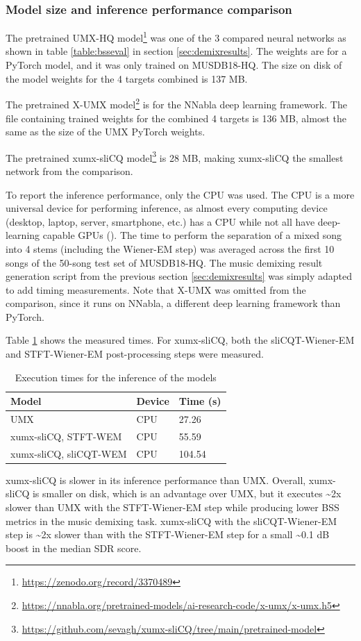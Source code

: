 \documentclass[report.tex]{subfiles}
\begin{document}
\newpagefill

\subsubsection{Model size and inference performance comparison}
\label{sec:inferenceperf}

The pretrained UMX-HQ model\footnote{\url{https://zenodo.org/record/3370489}} was one of the 3 compared neural networks as shown in table \ref{table:bsseval} in section \ref{sec:demixresults}. The weights are for a PyTorch model, and it was only trained on MUSDB18-HQ. The size on disk of the model weights for the 4 targets combined is 137 MB.

The pretrained X-UMX model\footnote{\url{https://nnabla.org/pretrained-models/ai-research-code/x-umx/x-umx.h5}} is for the NNabla deep learning framework. The file containing trained weights for the combined 4 targets is 136 MB, almost the same as the size of the UMX PyTorch weights.

The pretrained xumx-sliCQ model\footnote{\url{https://github.com/sevagh/xumx-sliCQ/tree/main/pretrained-model}} is 28 MB, making xumx-sliCQ the smallest network from the comparison.

To report the inference performance, only the CPU was used. The CPU is a more universal device for performing inference, as almost every computing device (desktop, laptop, server, smartphone, etc.) has a CPU while not all have deep-learning capable GPUs (\cite{deepcpuinf, deepcpuinf2}). The time to perform the separation of a mixed song into 4 stems (including the Wiener-EM step) was averaged across the first 10 songs of the 50-song test set of MUSDB18-HQ. The music demixing result generation script from the previous section \ref{sec:demixresults} was simply adapted to add timing measurements. Note that X-UMX was omitted from the comparison, since it runs on NNabla, a different deep learning framework than PyTorch.

Table \ref{table:infperf} shows the measured times. For xumx-sliCQ, both the sliCQT-Wiener-EM and STFT-Wiener-EM post-processing steps were measured.

\begin{table}[ht]
	\centering
	\begin{tabular}{ |l|l|l| }
	 \hline
		Model & Device & Time (s) \\
	 \hline
	 \hline
		UMX & CPU & 27.26  \\
	 \hline
		xumx-sliCQ, STFT-WEM & CPU & 55.59  \\
	 \hline
		xumx-sliCQ, sliCQT-WEM & CPU & 104.54  \\
	 \hline
\end{tabular}
	\caption{Execution times for the inference of the models}
	\label{table:infperf}
\end{table}

xumx-sliCQ is slower in its inference performance than UMX. Overall, xumx-sliCQ is smaller on disk, which is an advantage over UMX, but it executes \textasciitilde2x slower than UMX with the STFT-Wiener-EM step while producing lower BSS metrics in the music demixing task. xumx-sliCQ with the sliCQT-Wiener-EM step is \textasciitilde2x slower than with the STFT-Wiener-EM step for a small \textasciitilde0.1 dB boost in the median SDR score.
\end{document}
